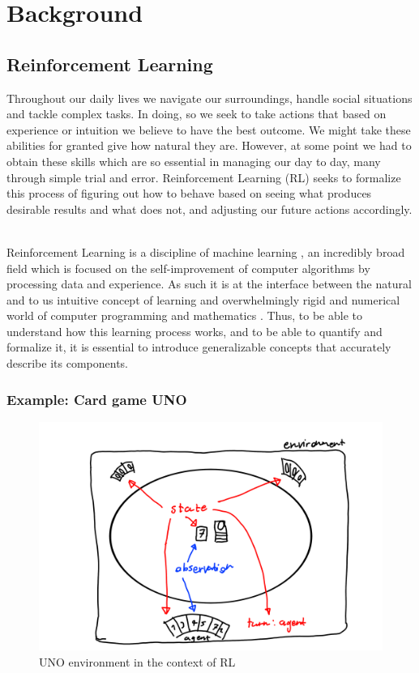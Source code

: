 \chapter{Background}\label{chap:theory}
\section{Reinforcement Learning}\label{sec:RL}
\noindent
Throughout our daily lives we navigate our surroundings, handle social situations and tackle complex tasks. In doing, so we seek to take actions that based on experience or intuition we believe to have the best outcome. We might take these abilities for granted give how natural they are. However, at some point we had to obtain these skills which are so essential in managing our day to day, many through simple trial and error. Reinforcement Learning (RL) seeks to formalize this process of figuring out how to behave based on seeing what produces desirable results and what does not, and adjusting our future actions accordingly. 

\noindent
\\ Reinforcement Learning is a discipline of machine learning \cite[p. 1]{sutton_reinforcement_2018} , an incredibly broad field which is focused on the self-improvement of computer algorithms by processing data and experience. As such it is at the interface between the natural and to us intuitive concept of learning and overwhelmingly rigid and numerical world of computer programming and mathematics \cite[p. 4]{sutton_reinforcement_2018}. Thus, to be able to understand how this learning process works, and to be able to quantify and formalize it, it is essential to introduce generalizable concepts that accurately describe its components. 

\subsection*{Example: Card game UNO}\label{subsec:UNO}

\begin{figure}[ht]
    \centering
    \includegraphics[width=\linewidth]{figures/UNO.png}
    \caption{UNO environment in the context of RL}
    \label{fig:UNO}
\end{figure}

